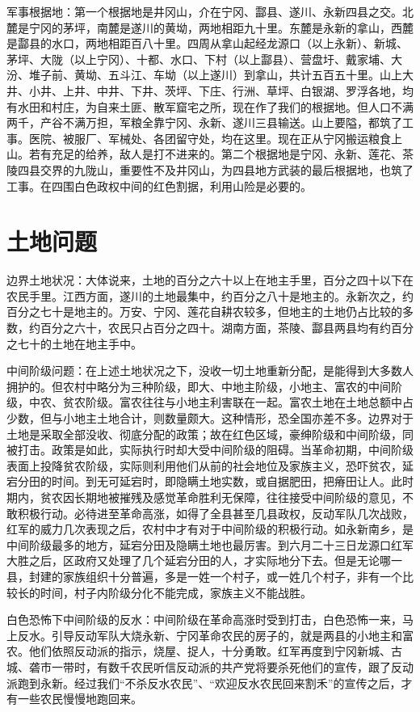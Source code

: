 军事根据地：第一个根据地是井冈山，介在宁冈、酃县、遂川、永新四县之交。北麓是宁冈的茅坪，南麓是遂川的黄坳，两地相距九十里。东麓是永新的拿山，西麓是酃县的水口，两地相距百八十里。四周从拿山起经龙源口（以上永新）、新城、茅坪、大陇（以上宁冈）、十都、水口、下村（以上酃县）、营盘圩、戴家埔、大汾、堆子前、黄坳、五斗江、车坳（以上遂川）到拿山，共计五百五十里。山上大井、小井、上井、中井、下井、茨坪、下庄、行洲、草坪、白银湖、罗浮各地，均有水田和村庄，为自来土匪、散军窟宅之所，现在作了我们的根据地。但人口不满两千，产谷不满万担，军粮全靠宁冈、永新、遂川三县输送。山上要隘，都筑了工事。医院、被服厂、军械处、各团留守处，均在这里。现在正从宁冈搬运粮食上山。若有充足的给养，敌人是打不进来的。第二个根据地是宁冈、永新、莲花、茶陵四县交界的九陇山，重要性不及井冈山，为四县地方武装的最后根据地，也筑了工事。在四围白色政权中间的红色割据，利用山险是必要的。

\section{土地问题}

边界土地状况：大体说来，土地的百分之六十以上在地主手里，百分之四十以下在农民手里。江西方面，遂川的土地最集中，约百分之八十是地主的。永新次之，约百分之七十是地主的。万安、宁冈、莲花自耕农较多，但地主的土地仍占比较的多数，约百分之六十，农民只占百分之四十。湖南方面，茶陵、酃县两县均有约百分之七十的土地在地主手中。

中间阶级问题：在上述土地状况之下，没收一切土地重新分配，是能得到大多数人拥护的。但农村中略分为三种阶级，即大、中地主阶级，小地主、富农的中间阶级，中农、贫农阶级。富农往往与小地主利害联在一起。富农土地在土地总额中占少数，但与小地主土地合计，则数量颇大。这种情形，恐全国亦差不多。边界对于土地是采取全部没收、彻底分配的政策；故在红色区域，豪绅阶级和中间阶级，同被打击。政策是如此，实际执行时却大受中间阶级的阻碍。当革命初期，中间阶级表面上投降贫农阶级，实际则利用他们从前的社会地位及家族主义，恐吓贫农，延宕分田的时间。到无可延宕时，即隐瞒土地实数，或自据肥田，把瘠田让人。此时期内，贫农因长期地被摧残及感觉革命胜利无保障，往往接受中间阶级的意见，不敢积极行动。必待进至革命高涨，如得了全县甚至几县政权，反动军队几次战败，红军的威力几次表现之后，农村中才有对于中间阶级的积极行动。如永新南乡，是中间阶级最多的地方，延宕分田及隐瞒土地也最厉害。到六月二十三日龙源口红军大胜之后，区政府又处理了几个延宕分田的人，才实际地分下去。但是无论哪一县，封建的家族组织十分普遍，多是一姓一个村子，或一姓几个村子，非有一个比较长的时间，村子内阶级分化不能完成，家族主义不能战胜。

白色恐怖下中间阶级的反水：中间阶级在革命高涨时受到打击，白色恐怖一来，马上反水。引导反动军队大烧永新、宁冈革命农民的房子的，就是两县的小地主和富农。他们依照反动派的指示，烧屋、捉人，十分勇敢。红军再度到宁冈新城、古城、砻市一带时，有数千农民听信反动派的共产党将要杀死他们的宣传，跟了反动派跑到永新。经过我们“不杀反水农民”、“欢迎反水农民回来割禾”的宣传之后，才有一些农民慢慢地跑回来。

